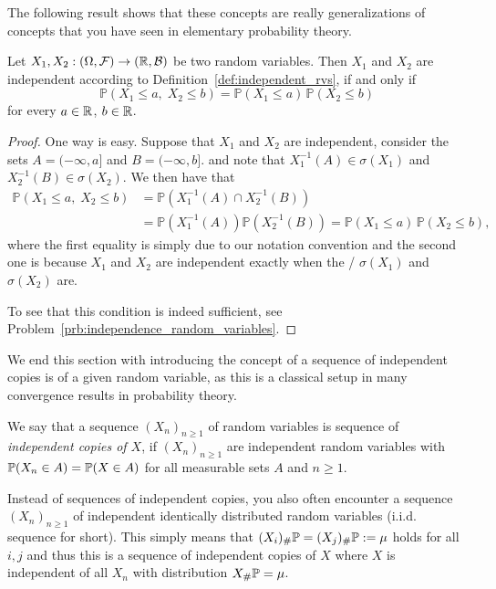 The following result shows that these concepts are really generalizations of concepts that you have seen in elementary probability theory.

\begin{lemma}\label{lem:independence_random_variables}
Let $X_1, X_2: (\Omega, \mathcal F) \to (\mathbb R, \mathcal B)$ be two random variables. Then $X_1$ and $X_2$ are independent according to Definition~\ref{def:independent_rvs}, if and only if 
	\[
	\mathbb{P}( X_1 \leq a,\; X_2 \leq b ) = \mathbb{P}(X_1 \leq a)\, \mathbb{P}(X_2 \leq b)
	\]
	for every $a \in \mathbb R$, $b \in \mathbb R$.
\end{lemma}

\begin{proof}
One way is easy. Suppose that $X_1$ and $X_2$ are independent, consider the sets $A = (-\infty,a]$ and $B = (-\infty, b]$. and note that $X_1^{-1}(A) \in \sigma(X_1)$ and $X_2^{-1}(B) \in \sigma(X_2)$. We then have that
\begin{align*}
	\mathbb{P}( X_1 \leq a,\; X_2 \leq b ) &= \mathbb{P}(X_1^{-1}(A) \cap X_2^{-1}(B)) \\
	&= \mathbb{P}(X_1^{-1}(A))\mathbb{P}(X_2^{-1}(B)) = \mathbb{P}(X_1 \leq a)\, \mathbb{P}(X_2 \leq b),
\end{align*}
where the first equality is simply due to our notation convention and the second one is because $X_1$ and $X_2$ are independent exactly when the \sigalgs/ $\sigma(X_1)$ and $\sigma(X_2)$ are. 

To see that this condition is indeed sufficient, see Problem~\ref{prb:independence_random_variables}.
\end{proof}


We end this section with introducing the concept of a sequence of independent copies is of a given random variable, as this is a classical setup in many convergence results in probability theory. 

\begin{definition}\label{def:iid}
We say that a sequence $(X_n)_{n \ge 1}$ of random variables is sequence of \emph{independent copies of $X$}, if $(X_n)_{n \ge 1}$ are independent random variables with $\mathbb P(X_n \in A) = \mathbb P(X \in A)$ for all measurable sets $A$ and $n \ge 1$.
\end{definition}

\begin{remark}
Instead of sequences of independent copies, you also often encounter a sequence $(X_n)_{n\ge 1}$ of independent identically distributed random variables (i.i.d. sequence for short). This simply means that $(X_i)_\# \mathbb P = (X_j)_\# \mathbb P := \mu$ holds for all $i,j$ and thus this is a sequence of independent copies of $X$ where $X$ is independent of all $X_n$ with distribution $X_\# \mathbb P = \mu$.
\end{remark}

